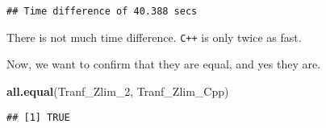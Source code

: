 \documentclass[]{article}
\newenvironment{Shaded}{\begin{snugshade}}{\end{snugshade}}
\newcommand{\DecValTok}[1]{\textcolor[rgb]{0.00,0.00,0.81}{#1}}
\newcommand{\KeywordTok}[1]{\textcolor[rgb]{0.13,0.29,0.53}{\textbf{#1}}}
\newcommand{\NormalTok}[1]{#1}
\begin{document}
\begin{verbatim}
## Time difference of 40.388 secs
\end{verbatim}

There is not much time difference. \texttt{C++} is only twice as fast.

Now, we want to confirm that they are equal, and yes they are.

\begin{Shaded}
\begin{Highlighting}[]
\KeywordTok{all.equal}\NormalTok{(Tranf_Zlim_}\DecValTok{2}\NormalTok{, Tranf_Zlim_Cpp)}
\end{Highlighting}
\end{Shaded}

\begin{verbatim}
## [1] TRUE
\end{verbatim}
\end{document}
